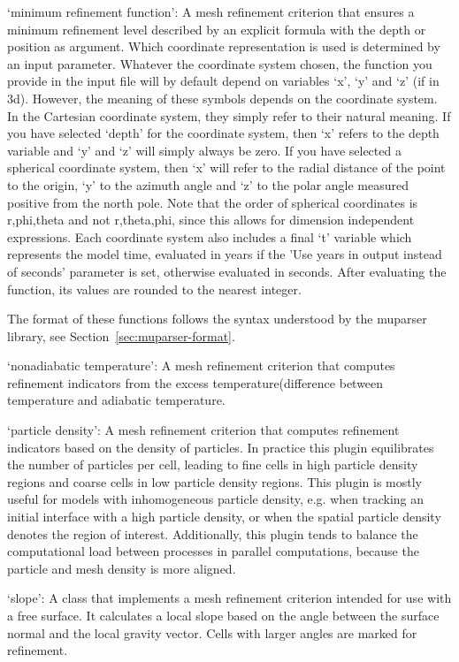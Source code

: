 \begin{itemize}
`minimum refinement function': A mesh refinement criterion that ensures a minimum refinement level described by an explicit formula with the depth or position as argument. Which coordinate representation is used is determined by an input parameter. Whatever the coordinate system chosen, the function you provide in the input file will by default depend on variables `x', `y' and `z' (if in 3d). However, the meaning of these symbols depends on the coordinate system. In the Cartesian coordinate system, they simply refer to their natural meaning. If you have selected `depth' for the coordinate system, then `x' refers to the depth variable and `y' and `z' will simply always be zero. If you have selected a spherical coordinate system, then `x' will refer to the radial distance of the point to the origin, `y' to the azimuth angle and `z' to the polar angle measured positive from the north pole. Note that the order of spherical coordinates is r,phi,theta and not r,theta,phi, since this allows for dimension independent expressions. Each coordinate system also includes a final `t' variable which represents the model time, evaluated in years if the 'Use years in output instead of seconds' parameter is set, otherwise evaluated in seconds. After evaluating the function, its values are rounded to the nearest integer.

The format of these functions follows the syntax understood by the muparser library, see Section~\ref{sec:muparser-format}.

`nonadiabatic temperature': A mesh refinement criterion that computes refinement indicators from the excess temperature(difference between temperature and adiabatic temperature.

`particle density': A mesh refinement criterion that computes refinement indicators based on the density of particles. In practice this plugin equilibrates the number of particles per cell, leading to fine cells in high particle density regions and coarse cells in low particle density regions. This plugin is mostly useful for models with inhomogeneous particle density, e.g. when tracking an initial interface with a high particle density, or when the spatial particle density denotes the region of interest. Additionally, this plugin tends to balance the computational load between processes in parallel computations, because the particle and mesh density is more aligned.

`slope': A class that implements a mesh refinement criterion intended for use with a free surface. It calculates a local slope based on the angle between the surface normal and the local gravity vector. Cells with larger angles are marked for refinement.


\end{itemize}
